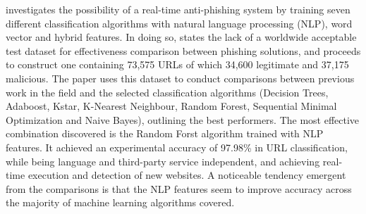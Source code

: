 \cite{Sahingoz_Ozgur} investigates the possibility of a real-time anti-phishing system by training seven different classification algorithms with natural language processing (NLP), word vector and hybrid features. In doing so, \cite{Sahingoz_Ozgur} states the lack of a worldwide acceptable test dataset for effectiveness comparison between phishing solutions, and proceeds to construct one containing 73,575 URLs of which 34,600 legitimate and 37,175 malicious. The paper uses this dataset to conduct comparisons between previous work in the field and the selected classification algorithms (Decision Trees, Adaboost, Kstar, K-Nearest Neighbour, Random Forest, Sequential Minimal Optimization and Naive Bayes), outlining the best performers. The most effective combination discovered is the Random Forst algorithm trained with NLP features. It achieved an experimental accuracy of 97.98\% in URL classification, while being language and third-party service independent, and achieving real-time execution and detection of new websites. A noticeable tendency emergent from the comparisons is that the NLP features seem to improve accuracy across the majority of machine learning algorithms covered.


